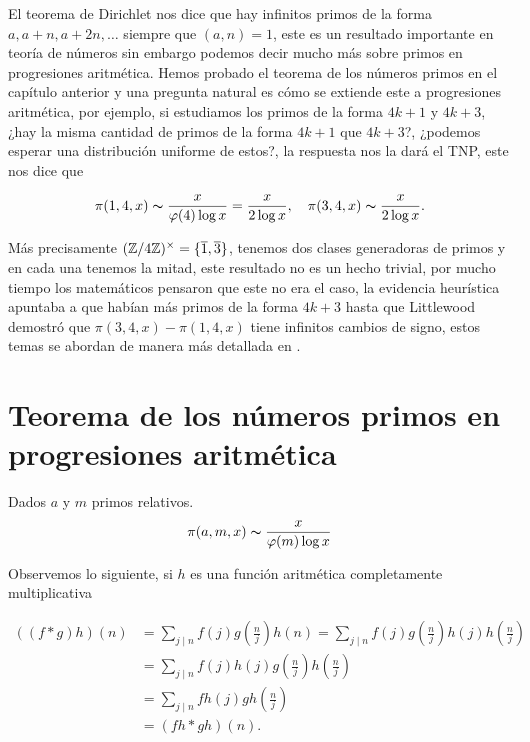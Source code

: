 
\thispagestyle{empty}
\vspace{-0.5cm}


El teorema de Dirichlet nos dice que hay infinitos primos de la forma $a,a+n , a+2n,\ldots$ siempre que $(a,n)=1$, este es un resultado importante en teoría de números sin embargo podemos decir mucho más sobre primos en progresiones aritmética. Hemos probado el teorema de los números primos en el capítulo anterior y una pregunta natural es cómo se extiende este a progresiones aritmética, por ejemplo, si estudiamos los primos de la forma $4k+1$ y $4k+3$, ¿hay la misma cantidad de primos de la forma $4k+1$ que $4k+3$?, ¿podemos esperar una distribución uniforme de estos?, la respuesta nos la dará el TNP, este nos dice que

$$\pi(1,4,x)\thicksim \frac{x}{\varphi(4)\log x}=\frac{x}{2\log x},\quad \pi(3,4,x)\thicksim \frac{x}{2\log x}.$$

Más precisamente $(\mathbb{Z}/4\mathbb{Z})^\times=\{\overline{1},\overline{3}\}$, tenemos dos clases generadoras de primos y en cada una tenemos la mitad, este resultado no es un hecho trivial, por mucho tiempo los matemáticos pensaron que este no era el caso, la evidencia heurística apuntaba a que habían más primos de la forma $4k+3$ hasta que Littlewood demostró que $\pi(3,4,x)-\pi(1,4,x)$ tiene infinitos cambios de signo, estos temas se abordan de manera más detallada en \cite{granville2006prime}.

\section{Teorema de los números primos en progresiones aritmética}

\begin{theorem}
Dados $a$ y $m$ primos relativos.
    $$\pi(a,m,x)\thicksim \frac{x}{\varphi(m)\log x}$$    
\end{theorem}

Observemos lo siguiente, si $h$ es una función aritmética completamente multiplicativa

\begin{align*}
    ((f*g)h)(n)&=\sum_{j\mid n}f(j)g\left(\frac{n}{j}\right)h(n)=\sum_{j\mid n}f(j)g\left(\frac{n}{j}\right)h\left(j\right)h\left(\frac{n}{j}\right)\\
    &=\sum_{j\mid n}f(j)h\left(j\right)g\left(\frac{n}{j}\right)h\left(\frac{n}{j}\right)\\
    &=\sum_{j\mid n}fh(j)gh\left(\frac{n}{j}\right)\\
    &=(fh*gh)(n)
.\end{align*}

